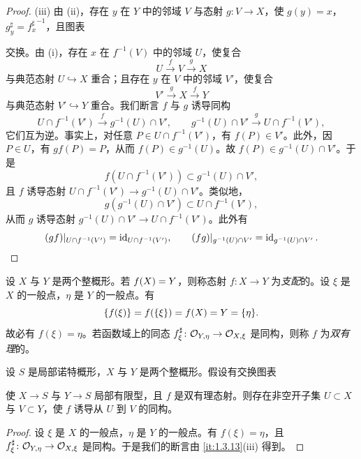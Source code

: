 \begin{proof}
(iii) 由 (ii)，存在 $y$ 在 $Y$ 中的邻域 $V$ 与态射 $g\colon V\to X$，使 $g(y)=x$，$g^\sharp_y={f^\sharp_x}^{-1}$，且图表
\begin{center}
\end{center}
交换。由 (i)，存在 $x$ 在 $f^{-1}(V)$ 中的邻域 $U$，使复合
\[
U\xrightarrow{f}V\xrightarrow{g}X
\]
与典范态射 $U\hookrightarrow X$ 重合；且存在 $y$ 在 $V$ 中的邻域 $V'$，使复合
\[
V'\xrightarrow{g}X\xrightarrow{f}Y
\]
与典范态射 $V'\hookrightarrow Y$ 重合。我们断言 $f$ 与 $g$ 诱导同构
\[
U\cap f^{-1}(V')\xrightarrow{f}g^{-1}(U)\cap V',
\qquad
g^{-1}(U)\cap V'\xrightarrow{g}U\cap f^{-1}(V'),
\]
它们互为逆。事实上，对任意 $P\in U\cap f^{-1}(V')$，有 $f(P)\in V'$。此外，因 $P\in U$，有 $gf(P)=P$，从而 $f(P)\in g^{-1}(U)$。故 $f(P)\in g^{-1}(U)\cap V'$。于是
\[
f(U\cap f^{-1}(V'))\subset g^{-1}(U)\cap V',
\]
且 $f$ 诱导态射 $U\cap f^{-1}(V')\to g^{-1}(U)\cap V'$。类似地，
\[
g(g^{-1}(U)\cap V')\subset U\cap f^{-1}(V'),
\]
从而 $g$ 诱导态射 $g^{-1}(U)\cap V'\to U\cap f^{-1}(V')$。此外有
\[
(gf)|_{U\cap f^{-1}(V')}=\operatorname{id}_{U\cap f^{-1}(V')},\qquad
(fg)|_{g^{-1}(U)\cap V'}=\operatorname{id}_{g^{-1}(U)\cap V'}.
\]
\end{proof}

设 $X$ 与 $Y$ 是两个整概形。若 $f(X)=Y$，则称态射 $f\colon X\to Y$ 为\emph{支配}的。设 $\xi$ 是 $X$ 的一般点，$\eta$ 是 $Y$ 的一般点。有
\[
\{f(\xi)\}=f(\{\xi\})=f(X)=Y=\{\eta\}.
\]
故必有 $f(\xi)=\eta$。若函数域上的同态 $f^\sharp_\xi\colon \mathcal{O}_{Y,\eta}\to \mathcal{O}_{X,\xi}$ 是同构，则称 $f$ 为\emph{双有理}的。

\begin{corollary}\label{it:1.3.14}
设 $S$ 是局部诺特概形，$X$ 与 $Y$ 是两个整概形。假设有交换图表
\begin{center}
\end{center}
使 $X\to S$ 与 $Y\to S$ 局部有限型，且 $f$ 是双有理态射。则存在非空开子集 $U\subset X$ 与 $V\subset Y$，使 $f$ 诱导从 $U$ 到 $V$ 的同构。
\end{corollary}

\begin{proof}
设 $\xi$ 是 $X$ 的一般点，$\eta$ 是 $Y$ 的一般点。有 $f(\xi)=\eta$，且 $f^\sharp_\xi\colon \mathcal{O}_{Y,\eta}\to \mathcal{O}_{X,\xi}$ 是同构。于是我们的断言由 \ref{it:1.3.13}(iii) 得到。
\end{proof}

